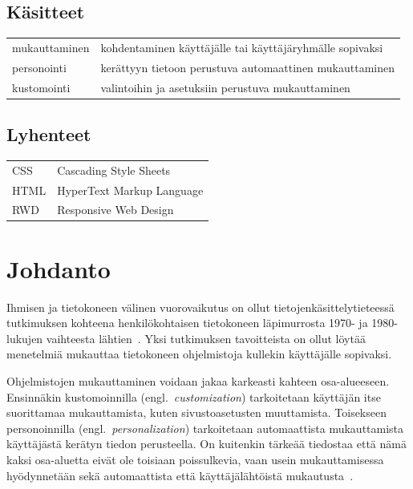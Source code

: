 \documentclass[finnish, 12pt, a4paper, elec, utf8, a-1b, online]{aaltothesis}
\date{xx.xx.2022}
\begin{document}
\makecoverpage{}

\makecopyrightpage{}

\begin{abstractpage}[finnish]
\end{abstractpage}

\thesistableofcontents{}


\subsection*{Käsitteet}

\begin{tabular}{ll}
    mukauttaminen & kohdentaminen käyttäjälle tai käyttäjäryhmälle sopivaksi \\
    personointi   & kerättyyn tietoon perustuva automaattinen mukauttaminen  \\
    kustomointi   & valintoihin ja asetuksiin perustuva mukauttaminen
\end{tabular}

\subsection*{Lyhenteet}

\begin{tabular}{ll}
    CSS  & Cascading Style Sheets    \\
    HTML & HyperText Markup Language \\
    RWD  & Responsive Web Design
\end{tabular}

\cleardoublepage{}

\section{Johdanto}

Ihmisen ja tietokoneen välinen vuorovaikutus on ollut tietojenkäsittelytieteessä
tutkimuksen kohteena henkilökohtaisen tietokoneen läpimurrosta 1970- ja
1980-lukujen vaihteesta lähtien~\cite{10.1145/800178.810088}. Yksi tutkimuksen
tavoitteista on ollut löytää menetelmiä mukauttaa tietokoneen ohjelmistoja
kullekin käyttäjälle sopivaksi.

Ohjelmistojen mukauttaminen voidaan jakaa karkeasti kahteen osa-alueeseen.
Ensinnäkin kustomoinnilla (engl.~\textit{customization}) tarkoitetaan käyttäjän
itse suorittamaa mukauttamista, kuten sivustoasetusten muuttamista. Toisekseen
personoinnilla (engl.~\textit{personalization}) tarkoitetaan automaattista
mukauttamista käyttäjästä kerätyn tiedon perusteella. On kuitenkin tärkeää
tiedostaa että nämä kaksi osa-aluetta eivät ole toisiaan poissulkevia, vaan
usein mukauttamisessa hyödynnetään sekä automaattista että käyttäjälähtöistä
mukautusta~\cite{10.1145/633292.633483}.
\end{document}
